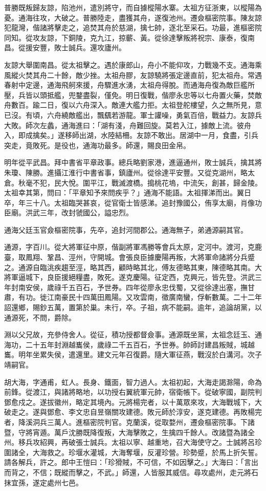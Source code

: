 \begin{pinyinscope}
普勝既叛歸友諒，陷池州，遣別將守，而自據樅陽水寨。太祖方征浙東，以樅陽為憂。通海往攻，大破之。普勝陸走，盡獲其舟，遂復池州。遷僉樞密院事。陳友諒犯龍灣，偕諸將擊走之，追焚其舟於慈湖，擒七帥，逐北至采石。功最，進樞密院同知。從攻友諒，下銅陵，克九江，掠蘄、黃。從徐達擊叛將祝宗、康泰，復南昌。從援安豐，敗士誠兵。還攻廬州。

友諒大舉圍南昌。從太祖擊之。遇於康郎山，舟小不能仰攻，力戰幾不支。通海乘風縱火焚其舟二十餘，敵少挫。太祖舟膠，友諒驍將張定邊直前，犯太祖舟。常遇春射中定邊，通海飛舸來援，舟驟進水湧，太祖舟得脫。而通海舟復為敵巨艦所壓，兵皆以頭抵艦，兜鍪盡裂，僅免。明日復戰，偕廖永忠等以七舟置火藥，焚敵舟數百。踰二日，復以六舟深入。敵連大艦力拒。太祖登舵樓望，久之無所見，意已沒。有頃，六舟繞敵艦出，飄颻若游龍。軍士讙噪，勇氣百倍，戰益力。友諒兵大敗。師次左蠡，通海進曰：「湖有淺，舟難回旋。莫若入江，據敵上流。彼舟入，即成擒矣。」遂移師出湖，水陸結柵。友諒不敢出。居湖中一月，食盡，引兵突走，竟敗死。是役也，通海功最多。師還，賜良田金帛。

明年從平武昌。拜中書省平章政事。總兵略劉家港，進逼通州，敗士誠兵，擒其將朱瓊、陳勝。進攝江淮行中書省事，鎮廬州。從徐達平安豐。又從克湖州，略太倉。秋毫不犯，民大悅。圍平江，戰滅渡橋。搗桃花塢，中流矢，創甚，歸金陵。太祖幸其第，問曰：「平章知予來問疾乎？」通海不能語。太祖揮涕而出。翼日卒，年三十八。太祖臨哭甚哀，從官衛士皆感涕。追封豫國公，侑享太廟，肖像功臣廟。洪武三年，改封虢國公，謚忠烈。

通海父廷玉官僉樞密院事，先卒，追封河間郡公。通海無子，弟通源嗣其官。

通源，字百川。從大將軍征中原，偕副將軍馮勝等會兵太原，定河中。渡河，克鹿臺，取鳳翔、鞏昌、涇州，守開城。會張良臣據慶陽再叛，大將軍命諸將分兵蹙之。通源自臨洮疾趨至涇，略其西，顧時略其北，傅友德略其東，陳德略其南。大將軍逼城下，良臣援絕糧盡，敗死。遂克慶陽。征定西，克興元，皆先登。洪武三年封南安侯，歲祿千五百石，予世券。四年從廖永忠伐蜀，又從徐達出塞，撫甘肅，有功。徙江南豪民十四萬田鳳陽。又攻雲南，徵廣南蠻，俘斬數萬。二十二年詔還鄉，賜鈔五萬，置第於巢。未行，卒。子祖，病不能嗣。逾年，追論胡黨，以通源死，不問，爵除。

淵以父兄故，充參侍舍人。從征，積功授都督僉事。通源既坐黨，太祖念廷玉、通海功，二十五年封淵越巂侯，歲祿二千五百石，予世券。帥師討建昌叛賊，城越巂。明年坐累失侯，遣還里。建文元年召復爵。隨大軍征燕，戰沒於白溝河。次子靖嗣官。

胡大海，字通甫，虹人。長身、鐵面，智力過人。太祖初起，大海走謁滁陽，命為前鋒。從渡江，與諸將略地，以功授右翼統軍元帥，宿衛帳下。從破寧國，副院判鄧愈戍之。遂拔徽州，略定其境內。元將楊完者，以十萬眾來攻，大海戰城下，大破走之。遂與鄧愈、李文忠自昱嶺關攻建德。敗元師於淳安，遂克建德。再敗楊完者，降溪洞兵三萬人。進樞密院判官。克蘭溪，從取婺州，遷僉樞密院事。下諸暨，守將宵遁。萬戶沈勝既降復叛，大海擊敗之，生擒四千餘人。改諸暨為諸全州。移兵攻紹興，再破張士誠兵。太祖以寧、越重地，召大海使守之。士誠將呂珍圍諸全，大海救之。珍堰水灌城，大海奪堰，反灌珍營。珍勢蹙，於馬上折矢誓。請各解兵，許之。郎中王愷曰：「珍猾賊，不可信，不如因擊之。」大海曰：「言出而背之，不信；既縱而擊之，不武。」師還，人皆服其威信。尋攻處州，走元將石抹宜孫，遂定處州七邑。


\end{pinyinscope}
